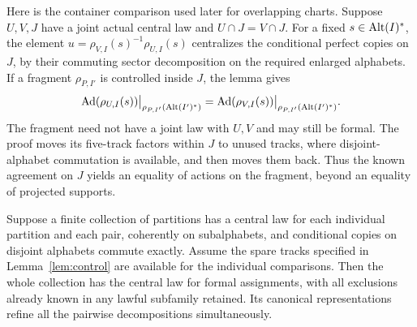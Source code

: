 Here is the container comparison used later for overlapping charts.
Suppose $U,V,J$ have a joint actual central law and
$U\cap J=V\cap J$. For a fixed $s\in\operatorname{Alt}(I)^\ast$, the element
$u=\rho_{V,I}(s)^{-1}\rho_{U,I}(s)$ centralizes the conditional
perfect copies on $J$, by their commuting sector decomposition on the
required enlarged alphabets. If a fragment $\rho_{P,I'}$ is controlled
inside $J$, the lemma gives
\[
 \operatorname{Ad}(\rho_{U,I}(s))\big|_{\rho_{P,I'}(\operatorname{Alt}(I')^\ast)}
 =\operatorname{Ad}(\rho_{V,I}(s))\big|_{\rho_{P,I'}(\operatorname{Alt}(I')^\ast)}.
\]
The fragment need not have a joint law with $U,V$ and may still be
formal. The proof moves its five-track factors within $J$ to unused
tracks, where disjoint-alphabet commutation is available, and then
moves them back. Thus the known agreement on $J$ yields an equality of
actions on the fragment, beyond an equality of projected supports.

\begin{lemma}
\label{lem:pair-laws}
Suppose a finite collection of partitions has a central law
for each individual partition and each pair, coherently on
subalphabets, and conditional
copies on disjoint alphabets commute exactly.  Assume the
spare tracks specified in Lemma~\ref{lem:control} are available
for the individual comparisons.  Then the whole
collection has the central law for formal assignments, with
all exclusions already known in any lawful subfamily retained.
Its canonical representations refine all the pairwise
decompositions simultaneously.
\end{lemma}

